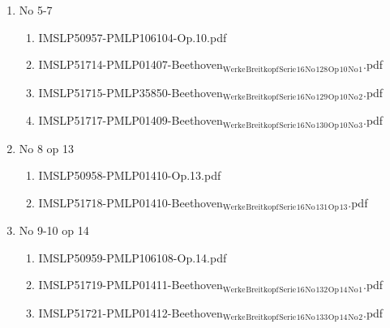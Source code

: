 \documentclass[11pt]{article}
\begin{document}
\begin{enumerate}
\begin{enumerate}
\begin{enumerate}
\item No 5-7
\label{sec-1-1-1-1-44-9-6-8-72}
\begin{enumerate}
\item IMSLP50957-PMLP106104-Op.10.pdf
\label{sec-1-1-1-1-44-9-6-8-72-1}

\item IMSLP51714-PMLP01407-Beethoven$_{\text{Werke}}$$_{\text{Breitkopf}}$$_{\text{Serie}}$$_{\text{16}}$$_{\text{No}}$$_{\text{128}}$$_{\text{Op}}$$_{\text{10}}$$_{\text{No}}$$_{\text{1}}$.pdf
\label{sec-1-1-1-1-44-9-6-8-72-2}

\item IMSLP51715-PMLP35850-Beethoven$_{\text{Werke}}$$_{\text{Breitkopf}}$$_{\text{Serie}}$$_{\text{16}}$$_{\text{No}}$$_{\text{129}}$$_{\text{Op}}$$_{\text{10}}$$_{\text{No}}$$_{\text{2}}$.pdf
\label{sec-1-1-1-1-44-9-6-8-72-3}

\item IMSLP51717-PMLP01409-Beethoven$_{\text{Werke}}$$_{\text{Breitkopf}}$$_{\text{Serie}}$$_{\text{16}}$$_{\text{No}}$$_{\text{130}}$$_{\text{Op}}$$_{\text{10}}$$_{\text{No}}$$_{\text{3}}$.pdf
\label{sec-1-1-1-1-44-9-6-8-72-4}
\end{enumerate}

\item No 8 op 13
\label{sec-1-1-1-1-44-9-6-8-73}
\begin{enumerate}
\item IMSLP50958-PMLP01410-Op.13.pdf
\label{sec-1-1-1-1-44-9-6-8-73-1}

\item IMSLP51718-PMLP01410-Beethoven$_{\text{Werke}}$$_{\text{Breitkopf}}$$_{\text{Serie}}$$_{\text{16}}$$_{\text{No}}$$_{\text{131}}$$_{\text{Op}}$$_{\text{13}}$.pdf
\label{sec-1-1-1-1-44-9-6-8-73-2}
\end{enumerate}

\item No 9-10 op 14
\label{sec-1-1-1-1-44-9-6-8-74}
\begin{enumerate}
\item IMSLP50959-PMLP106108-Op.14.pdf
\label{sec-1-1-1-1-44-9-6-8-74-1}

\item IMSLP51719-PMLP01411-Beethoven$_{\text{Werke}}$$_{\text{Breitkopf}}$$_{\text{Serie}}$$_{\text{16}}$$_{\text{No}}$$_{\text{132}}$$_{\text{Op}}$$_{\text{14}}$$_{\text{No}}$$_{\text{1}}$.pdf
\label{sec-1-1-1-1-44-9-6-8-74-2}

\item IMSLP51721-PMLP01412-Beethoven$_{\text{Werke}}$$_{\text{Breitkopf}}$$_{\text{Serie}}$$_{\text{16}}$$_{\text{No}}$$_{\text{133}}$$_{\text{Op}}$$_{\text{14}}$$_{\text{No}}$$_{\text{2}}$.pdf
\label{sec-1-1-1-1-44-9-6-8-74-3}
\end{enumerate}
\end{enumerate}


\end{enumerate}
\end{enumerate}
\end{document}
